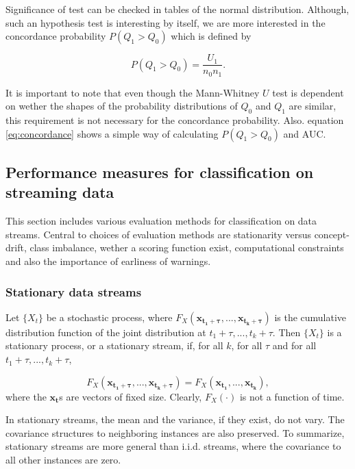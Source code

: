Significance of test can be checked in tables of the normal distribution.  Although, such an hypothesis test is interesting by itself, we are more interested in the concordance probability $P(Q_1 > Q_0)$ which is defined by

\begin{equation}
\label{eq:concordance}
P(Q_1 > Q_0) = \frac{U_1}{n_0n_1}.
\end{equation}

It is important to note that even though the Mann-Whitney $U$ test is dependent on wether the shapes of the probability distributions of $Q_0$ and $Q_1$ are similar, this requirement is not necessary for the concordance probability.  Also. equation \eqref{eq:concordance} shows a simple way of calculating $P(Q_1 > Q_0)$ and AUC.

\subsection{Performance measures for classification on streaming data}
\label{sec:stream}

This section includes various evaluation methods for classification on data streams.  Central to choices of evaluation methods are stationarity versus concept-drift, class imbalance, wether a scoring function exist, computational constraints and also the importance of earliness of warnings.

\subsubsection{Stationary data streams}

Let $\{X_{t}\}$ be a stochastic process, where $F_X(\bm{x_{t_1 + \tau}},...,\bm{x_{t_k + \tau}} )$ is the cumulative distribution function of the joint distribution at $t_1 + \tau,...,t_k + \tau$.  Then $\{X_t\}$ is a stationary process, or a stationary stream, if, for all $k$, for all $\tau$ and for all $t_1 + \tau,...,t_k + \tau$, 

\begin{equation}
\label{eq:stationarity}
F_X(\bm{x_{t_1 + \tau}},...,\bm{x_{t_k + \tau}} ) = F_X(\bm{x_{t_1}},...,\bm{x_{t_k}} ),
\end{equation}
where the $\bm{x_t}$s are vectors of fixed size.  Clearly, $F_X(\cdot)$ is not a function of time.  

In stationary streams, the mean and the variance, if they exist, do not vary.  The covariance structures to neighboring instances are also preserved.  To summarize, stationary streams are more general than i.i.d. streams, where the covariance to all other instances are zero.  

